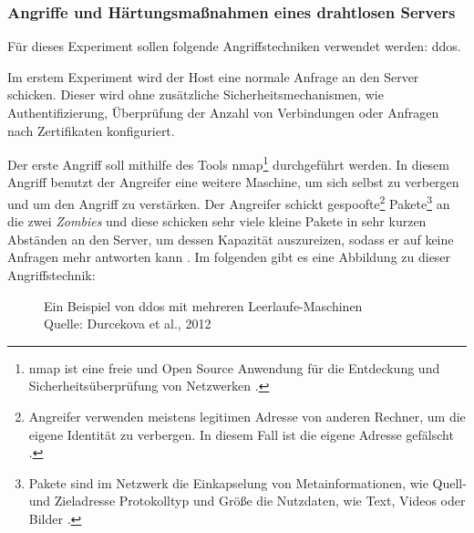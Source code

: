 \subsubsection{Angriffe und Härtungsmaßnahmen eines drahtlosen Servers}
Für dieses Experiment sollen folgende Angriffstechniken verwendet werden: \acrfull{ddos}.

Im erstem Experiment wird der Host eine normale Anfrage an den Server schicken. Dieser wird ohne zusätzliche 
Sicherheitsmechanismen, wie Authentifizierung, Überprüfung der Anzahl von Verbindungen oder Anfragen nach Zertifikaten 
konfiguriert.

Der erste Angriff soll mithilfe des Tools \acrfull{nmap}\footnote{\acrshort{nmap} ist eine freie und Open Source Anwendung
für die Entdeckung und Sicherheitsüberprüfung von Netzwerken \cite{refst:nmap}.} durchgeführt werden. In diesem Angriff 
benutzt der Angreifer eine weitere Maschine, um sich selbst zu verbergen und um den Angriff zu verstärken. Der Angreifer
schickt gespoofte\footnote{Angreifer verwenden meistens legitimen Adresse von anderen Rechner, um die eigene Identität
zu verbergen. In diesem Fall ist die eigene Adresse gefälscht \cite{refst:IPIO}.} Pakete\footnote{Pakete sind im Netzwerk
die Einkapselung von Metainformationen, wie Quell-und Zieladresse Protokolltyp und Größe die Nutzdaten, wie Text, 
Videos oder Bilder \cite{refbook:SWIS}.} an die zwei \textit{Zombies} und diese schicken sehr viele kleine Pakete in sehr
kurzen Abständen an den Server, um dessen Kapazität auszureizen, sodass er auf keine Anfragen mehr antworten kann 
\cite{refip:KSDD}. Im folgenden gibt es eine Abbildung zu dieser Angriffstechnik:

\begin{figure}[H]
  \caption{Ein Beispiel von \acrfull{ddos} mit mehreren Leerlaufe-Maschinen
  \\ Quelle: Durcekova et al., 2012}
  \label{fig:VDSD}
\end{figure}

